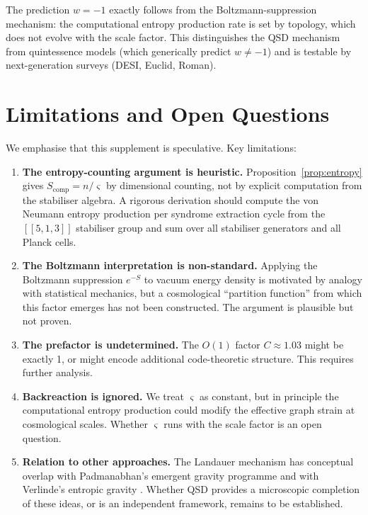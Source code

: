 \documentclass[11pt,a4paper]{article}
\theoremstyle{definition}
\newcommand{\strain}{\varsigma}            %
\begin{document}
The prediction $w = -1$ exactly follows from the Boltzmann-suppression mechanism: the computational entropy production rate is set by topology, which does not evolve with the scale factor. This distinguishes the QSD mechanism from quintessence models (which generically predict $w \neq -1$) and is testable by next-generation surveys (DESI, Euclid, Roman).


\section{Limitations and Open Questions}

We emphasise that this supplement is speculative. Key limitations:

\begin{enumerate}
    \item \textbf{The entropy-counting argument is heuristic.} Proposition~\ref{prop:entropy} gives $S_{\text{comp}} = n/\strain$ by dimensional counting, not by explicit computation from the stabiliser algebra. A rigorous derivation should compute the von Neumann entropy production per syndrome extraction cycle from the $[[5,1,3]]$ stabiliser group and sum over all stabiliser generators and all Planck cells.

    \item \textbf{The Boltzmann interpretation is non-standard.} Applying the Boltzmann suppression $e^{-S}$ to vacuum energy density is motivated by analogy with statistical mechanics, but a cosmological ``partition function'' from which this factor emerges has not been constructed. The argument is plausible but not proven.

    \item \textbf{The prefactor is undetermined.} The $O(1)$ factor $C \approx 1.03$ might be exactly 1, or might encode additional code-theoretic structure. This requires further analysis.

    \item \textbf{Backreaction is ignored.} We treat $\strain$ as constant, but in principle the computational entropy production could modify the effective graph strain at cosmological scales. Whether $\strain$ runs with the scale factor is an open question.

    \item \textbf{Relation to other approaches.} The Landauer mechanism has conceptual overlap with Padmanabhan's emergent gravity programme \cite{Padmanabhan2010} and with Verlinde's entropic gravity \cite{Verlinde2011}. Whether QSD provides a microscopic completion of these ideas, or is an independent framework, remains to be established.
\end{enumerate}
\end{document}
